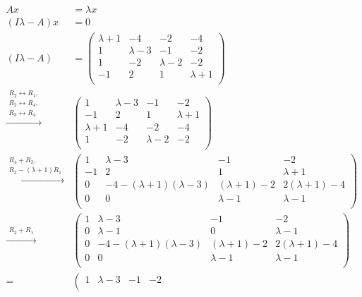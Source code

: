 \documentclass[12pt]{article}
\newenvironment{problem}[2][Problem]{\begin{trivlist}
\item[\hskip \labelsep {\bfseries #1}\hskip \labelsep {\bfseries #2.}]}{\end{trivlist}}
\begin{document}
\begin{problem}{2.i}
\end{problem}
\begin{align*}
Ax &= \lambda x\\
(I\lambda - A)x &= 0\\
(I\lambda - A) &= 
\left( \begin{array}{cccc}
\lambda + 1 & -4 & -2 & -4\\
1 & \lambda - 3 & -1 & -2\\
1 & -2 & \lambda - 2 & -2\\
-1 & 2 & 1 &\lambda + 1\\
\end{array} \right)\\
\xrightarrow{\substack{R_2 \leftrightarrow R_1,\\R_2 \leftrightarrow  R_4,\\R_3 \leftrightarrow R_4}}
&
\left( \begin{array}{cccc}
1 & \lambda - 3 & -1 & -2\\
-1 & 2 & 1 &\lambda + 1\\
\lambda + 1 & -4 & -2 & -4\\
1 & -2 & \lambda - 2 & -2\\
\end{array} \right)\\
\xrightarrow{\substack{R_4 + R_2,\\R_3 - (\lambda + 1)R_1}}
&
\left( \begin{array}{cccc}
1 & \lambda - 3 & -1 & -2\\
-1 & 2 & 1 &\lambda + 1\\
0 & -4 - (\lambda + 1)(\lambda - 3) & (\lambda + 1)-2 & 2(\lambda + 1)-4\\
0 & 0 & \lambda - 1 & \lambda-1\\
\end{array} \right)\\
\xrightarrow{\substack{R_2 + R_1}}
&
\left( \begin{array}{cccc}
1 & \lambda - 3 & -1 & -2\\
0 & \lambda - 1 & 0 &\lambda - 1\\
0 & -4 - (\lambda + 1)(\lambda - 3) & (\lambda + 1)-2 & 2(\lambda + 1)-4\\
0 & 0 & \lambda - 1 & \lambda-1\\
\end{array} \right)\\
=&
\left( \begin{array}{cccc}
1 & \lambda - 3 & -1 & -2\\

\end{array}
\end{align*}
\end{document}

